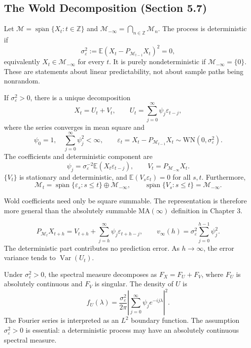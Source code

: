 \subsection{The Wold Decomposition (Section 5.7)}
\begin{definition}
Let $\mathcal M=\overline{\operatorname{span}}\{X_t:t\in\mathbb Z\}$ and
$\mathcal M_{-\infty}=\bigcap_{n\in\mathbb Z}\mathcal M_n$.
The process is deterministic if
\[
\sigma_\varepsilon^2:=\mathbb E(X_t-P_{\mathcal M_{t-1}}X_t)^2=0,
\]
equivalently $X_t\in\mathcal M_{-\infty}$ for every $t$.
It is purely nondeterministic if $\mathcal M_{-\infty}=\{0\}$.
These are statements about linear predictability, not about sample paths
being nonrandom.
\end{definition}
\begin{theorem}
If $\sigma_\varepsilon^2>0$, there is a unique decomposition
\[
X_t=U_t+V_t,\qquad U_t=\sum_{j=0}^{\infty}\psi_j\varepsilon_{t-j},
\]
where the series converges in mean square and
\[
\psi_0=1,\quad\sum_{j=0}^{\infty}\psi_j^2<\infty,\qquad
\varepsilon_t=X_t-P_{\mathcal M_{t-1}}X_t
\sim\mathrm{WN}(0,\sigma_\varepsilon^2).
\]
The coefficients and deterministic component are
\[
\psi_j=\sigma_\varepsilon^{-2}\mathbb E(X_t\varepsilon_{t-j}),
\qquad V_t=P_{\mathcal M_{-\infty}}X_t.
\]
$\{V_t\}$ is stationary and deterministic, and
$\mathbb E(V_s\varepsilon_t)=0$ for all $s,t$.
Furthermore,
\[
\mathcal M_t=
\overline{\operatorname{span}}\{\varepsilon_s:s\le t\}
\mathbin{\oplus}\mathcal M_{-\infty},\qquad
\overline{\operatorname{span}}\{V_s:s\le t\}=\mathcal M_{-\infty}.
\]
\end{theorem}
Wold coefficients need only be square summable. The representation is
therefore more general than the absolutely summable $\mathrm{MA}(\infty)$
definition in Chapter 3.
\begin{corollary}
\[
P_{\mathcal M_t}X_{t+h}
=V_{t+h}+\sum_{j=h}^{\infty}\psi_j\varepsilon_{t+h-j},
\qquad v_\infty(h)=\sigma_\varepsilon^2\sum_{j=0}^{h-1}\psi_j^2.
\]
The deterministic part contributes no prediction error.
As $h\to\infty$, the error variance tends to $\operatorname{Var}(U_t)$.
\end{corollary}
\begin{theorem}
Under $\sigma_\varepsilon^2>0$, the spectral measure decomposes as
$F_X=F_U+F_V$, where $F_U$ is absolutely continuous and $F_V$ is singular.
The density of $U$ is
\[
f_U(\lambda)=\frac{\sigma_\varepsilon^2}{2\pi}
\left|\sum_{j=0}^{\infty}\psi_je^{-ij\lambda}\right|^2.
\]
The Fourier series is interpreted as an $L^2$ boundary function.
The assumption $\sigma_\varepsilon^2>0$ is essential: a deterministic
process may have an absolutely continuous spectral measure.
\end{theorem}


